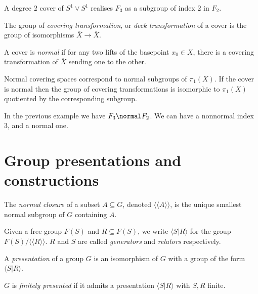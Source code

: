 \documentclass[a4paper]{article}
\begin{document}
\begin{eg}
  A degree \(2\) cover of \(S^1 \vee S^1\) realises \(F_3\) as a subgroup of index \(2\) in \(F_2\).
\end{eg}

The group of \emph{covering transformation}, or \emph{deck transformation} of a cover is the group of isomorphisms \(\overline X \to \overline X\).

A cover is \emph{normal} if for any two lifts of the basepoint \(x_0 \in X\), there is a covering transformation of \(\overline X\) sending one to the other.

Normal covering spaces correspond to normal subgroups of \(\pi_1(X)\). If the cover is normal then the group of covering transformations is isomorphic to \(\pi_1(X)\) quotiented by the corresponding subgroup.

\begin{eg}
  In the previous example we have \(F_3 \normal F_2\). We can have a nonnormal index 3, and a normal one.
\end{eg}

\section{Group presentations and constructions}

\begin{definition}
  The \emph{normal closure} of a subset \(A \subseteq G\), denoted \(\langle\langle A\rangle\rangle\), is the unique smallest normal subgroup of \(G\) containing \(A\).
\end{definition}

Given a free group \(F(S)\) and \(R \subseteq F(S)\), we write \(\langle S|R \rangle\) for the group \(F(S)/\langle\langle R\rangle\rangle\). \(R\) and \(S\) are called \emph{generators} and \emph{relators} respectively.

\begin{definition}
  A \emph{presentation} of a group \(G\) is an isomorphism of \(G\) with a group of the form \(\langle S|R \rangle\).

  \(G\) is \emph{finitely presented} if it admits a presentation \(\langle S|R \rangle\) with \(S, R\) finite.
\end{definition}
\end{document}
